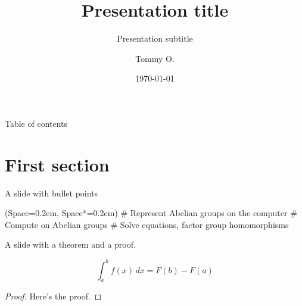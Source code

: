 \documentclass[12pt, aspectratio=149]{beamer}
\title{Presentation title}
\subtitle{Presentation subtitle}
\institute{Some corporation}
\date{\today}
\author{Tommy O.}
\newcommand{\listSpace}{0.2em}
\theoremstyle{plain}
\begin{document}
\maketitle
{}
  
\begin{frame}{Table of contents}
	\tableofcontents
\end{frame}

\section{First section}
\begin{frame}[fragile]{A slide with bullet points}
	\begin{easylist}[itemize]
		\ListProperties(Space=\listSpace, Space*=\listSpace)
		# Represent Abelian groups on the computer
		# Compute on Abelian groups
		# Solve equations, factor group homomorphisms
	\end{easylist}
\end{frame}

\begin{frame}[fragile]{A slide with a theorem and a proof.}
\begin{theorem}[Integral]
	\begin{equation*}
		\int_{a}^{b} f(x) \, dx = F(b) - F(a)
	\end{equation*}
\end{theorem}
\begin{proof}
Here's the proof.
\end{proof}
\end{frame}
\end{document}
